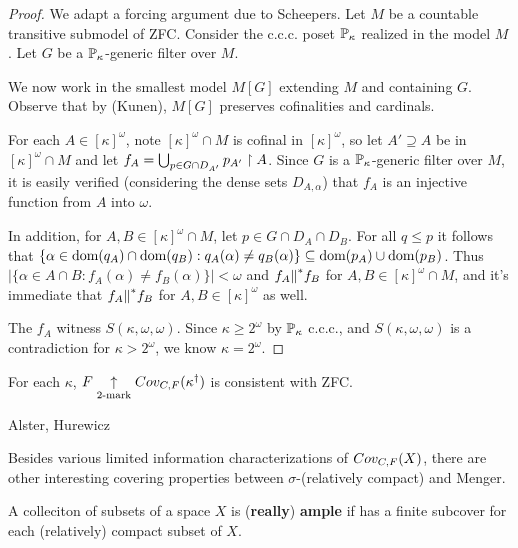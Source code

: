   \begin{proof}
    We adapt a forcing argument due to Scheepers. Let $M$ be a countable transitive submodel of ZFC. Consider the c.c.c. poset $\mathbb{P}_\kappa$ realized in the model $M$. Let $G$ be a $\mathbb{P}_\kappa$-generic filter over $M$.

    We now work in the smallest model $M[G]$ extending $M$ and containing $G$. Observe that by (Kunen), $M[G]$ preserves cofinalities and cardinals.

    For each $A\in [\kappa]^\omega$, note $[\kappa]^\omega\cap M$ is cofinal in $[\kappa]^\omega$, so let $A'\supseteq A$ be in $[\kappa]^\omega\cap M$ and let $f_A=\bigcup_{p\in G\cap D_{A'}}p_{A'}\restriction A$. Since $G$ is a $\mathbb{P}_\kappa$-generic filter over $M$, it is easily verified (considering the dense sets $D_{A,\alpha}$) that $f_A$ is an injective function from $A$ into $\omega$.

    In addition, for $A,B\in [\kappa]^\omega\cap M$, let $p\in G\cap D_A\cap D_B$. For all $q\leq p$ it follows that $\{\alpha\in \textrm{dom}(q_A)\cap \textrm{dom}(q_B): q_A(\alpha)\not= q_B(\alpha)\} \subseteq \textrm{dom}(p_A)\cup\textrm{dom}(p_B)$. Thus $|\{\alpha\in A\cap B: f_A(\alpha)\not= f_B(\alpha)\}|<\omega$ and $f_A{\parallel}^* f_B$ for $A,B\in [\kappa]^\omega\cap M$, and it's immediate that $f_A{\parallel}^* f_B$ for $A,B\in[\kappa]^\omega$ as well.

    The $f_A$ witness $S(\kappa,\omega,\omega)$. Since $\kappa\geq 2^\omega$ by $\mathbb{P}_\kappa$ c.c.c., and $S(\kappa,\omega,\omega)$ is a contradiction for $\kappa>2^\omega$, we know $\kappa=2^\omega$. 
  \end{proof}

  \begin{corollary}
    For each $\kappa$, $F\underset{2\text{-mark}}{\uparrow}Cov_{C,F}(\kappa^\dagger)$ is consistent with ZFC.
  \end{corollary}









\newpage

  \centerline{Alster, Hurewicz}

  Besides various limited information characterizations of $Cov_{C,F}(X)$, there are other interesting covering properties between $\sigma$-(relatively compact) and Menger.

  \begin{definition}
    A colleciton of subsets of a space $X$ is (\textbf{really}) \textbf{ample} if has a finite subcover for each (relatively) compact subset of $X$.
  \end{definition}

